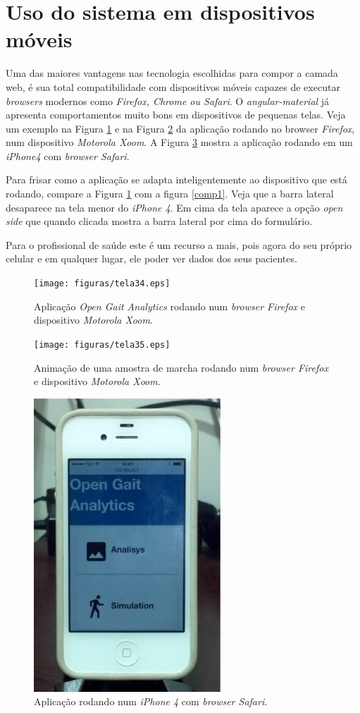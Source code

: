 \goodbreak
\newpage
\clearpage
\section{Uso do sistema em dispositivos móveis}
Uma das maiores vantagens nas tecnologia escolhidas para compor a camada web, é sua total compatibilidade com dispositivos móveis capazes de executar \emph{browsers} modernos como \emph{Firefox, Chrome ou Safari}. O \emph{angular-material} já apresenta comportamentos muito bons em dispositivos de pequenas telas. 
Veja um exemplo na Figura \ref{tela34} e na Figura \ref{tela35} da aplicação rodando no browser \emph{Firefox}, num dispositivo \emph{Motorola Xoom}. A Figura \ref{tela36} mostra a aplicação rodando em um \emph{iPhone4} com \emph{browser Safari}.

Para frisar como a aplicação se adapta inteligentemente ao dispositivo que está rodando, compare a Figura \ref{tela34} com a figura \ref{comp1}. Veja que a barra lateral desaparece na tela menor do \emph{iPhone 4}. Em cima da tela aparece a opção \emph{open side} que quando clicada mostra a barra lateral por cima do formulário.

Para o profissional de saúde este é um recurso a mais, pois agora do seu próprio celular e em qualquer lugar, ele poder ver dados dos seus pacientes.

\begin{figure}[ht]
	\centering
	\texttt{[image: figuras/tela34.eps]}
	\caption{Aplicação \emph{Open Gait Analytics} rodando num \emph{browser Firefox} e dispositivo \emph{Motorola Xoom}.}
\label{tela34}
\end{figure}

\begin{figure}[ht]
	\centering
	\texttt{[image: figuras/tela35.eps]}
	\caption{Animação de uma amostra de marcha rodando num \emph{browser Firefox} e dispositivo \emph{Motorola Xoom}.}
\label{tela35}
\end{figure}

\begin{figure}[ht]
	\centering
	\includegraphics[width=7cm]{figuras/tela36.eps}
	\caption{Aplicação rodando num \emph{iPhone 4} com \emph{browser Safari}.}
\label{tela36}
\end{figure}

